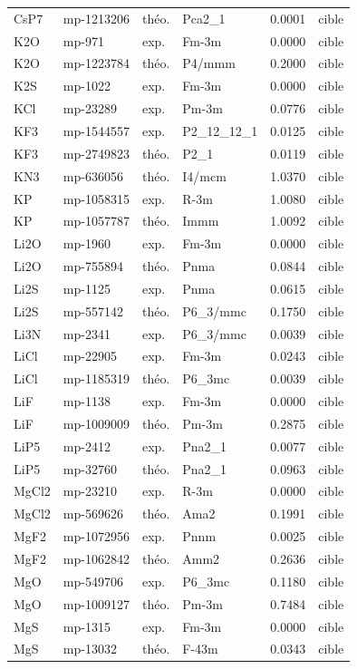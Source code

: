 \begin{longtable}{@{}lllllr@{}}
CsP7 & mp-1213206 & théo. & Pca2\_1 & 0.0001 & cible \\
K2O & mp-971 & exp. & Fm-3m & 0.0000 & cible \\
K2O & mp-1223784 & théo. & P4/mmm & 0.2000 & cible \\
K2S & mp-1022 & exp. & Fm-3m & 0.0000 & cible \\
KCl & mp-23289 & exp. & Pm-3m & 0.0776 & cible \\
KF3 & mp-1544557 & exp. & P2\_12\_12\_1 & 0.0125 & cible \\
KF3 & mp-2749823 & théo. & P2\_1 & 0.0119 & cible \\
KN3 & mp-636056 & théo. & I4/mcm & 1.0370 & cible \\
KP & mp-1058315 & exp. & R-3m & 1.0080 & cible \\
KP & mp-1057787 & théo. & Immm & 1.0092 & cible \\
Li2O & mp-1960 & exp. & Fm-3m & 0.0000 & cible \\
Li2O & mp-755894 & théo. & Pnma & 0.0844 & cible \\
Li2S & mp-1125 & exp. & Pnma & 0.0615 & cible \\
Li2S & mp-557142 & théo. & P6\_3/mmc & 0.1750 & cible \\
Li3N & mp-2341 & exp. & P6\_3/mmc & 0.0039 & cible \\
LiCl & mp-22905 & exp. & Fm-3m & 0.0243 & cible \\
LiCl & mp-1185319 & théo. & P6\_3mc & 0.0039 & cible \\
LiF & mp-1138 & exp. & Fm-3m & 0.0000 & cible \\
LiF & mp-1009009 & théo. & Pm-3m & 0.2875 & cible \\
LiP5 & mp-2412 & exp. & Pna2\_1 & 0.0077 & cible \\
LiP5 & mp-32760 & théo. & Pna2\_1 & 0.0963 & cible \\
MgCl2 & mp-23210 & exp. & R-3m & 0.0000 & cible \\
MgCl2 & mp-569626 & théo. & Ama2 & 0.1991 & cible \\
MgF2 & mp-1072956 & exp. & Pnnm & 0.0025 & cible \\
MgF2 & mp-1062842 & théo. & Amm2 & 0.2636 & cible \\
MgO & mp-549706 & exp. & P6\_3mc & 0.1180 & cible \\
MgO & mp-1009127 & théo. & Pm-3m & 0.7484 & cible \\
MgS & mp-1315 & exp. & Fm-3m & 0.0000 & cible \\
MgS & mp-13032 & théo. & F-43m & 0.0343 & cible \\

\end{longtable}

